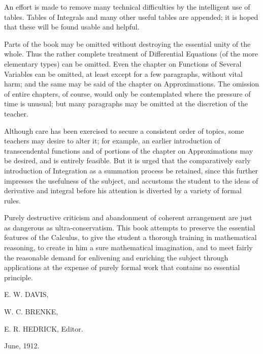 \documentclass[12pt]{article}
\begin{document}
An effort is made to remove many technical difficulties by
the intelligent use of tables. Tables of Integrals and many
other useful tables are appended; it is hoped that these will
be found usable and helpful.

Parts of the book may be omitted without destroying the
essential unity of the whole. Thus the rather complete treatment 
of Differential Equations (of the more elementary types)
can be omitted. Even the chapter on Functions of Several
Variables can be omitted, at least except for a few paragraphs,
without vital harm; and the same may be said of the chapter
on Approximations. The omission of entire chapters, of course,
would only be contemplated where the pressure of time is unusual; 
but many paragraphs may be omitted at the discretion
of the teacher.

Although care has been exercised to secure a consistent order
of topics, some teachers may desire to alter it; for example,
an earlier introduction of transcendental functions and of portions 
of the chapter on Approximations may be desired, and is
entirely feasible. But it is urged that the comparatively early
introduction of Integration as a summation process be retained,
since this further impresses the usefulness of the subject, and
accustoms the student to the ideas of derivative and integral
before his attention is diverted by a variety of formal rules.

Purely destructive criticism and abandonment of coherent
arrangement are just as dangerous as ultra-conservatism. This
book attempts to preserve the essential features of the Calculus,
to give the student a thorough training in mathematical reasoning, 
to create in him a sure mathematical imagination, and
to meet fairly the reasonable demand for enlivening and enriching 
the subject through applications at the expense of purely
formal work that contains no essential principle.

\begin{flushright}
E. W. DAVIS,

W. C. BRENKE,

E. R. HEDRICK, Editor.
\end{flushright}

June, 1912.
\end{document}
